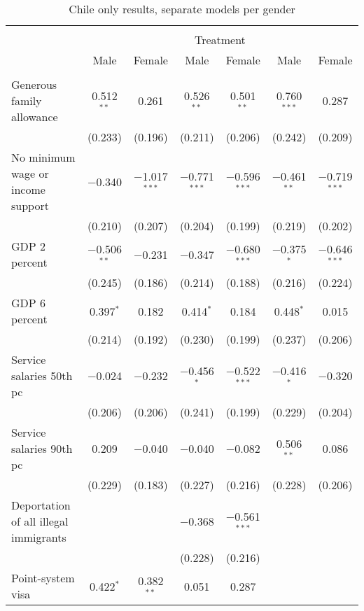 
\begin{sidewaystable}[!htbp] \centering 
  \caption{Chile only results, separate models per gender} 
  \label{tab:chile_gender} 
\begin{tabular}{@{\extracolsep{5pt}}lcccccc} 
\\[-1.8ex]\hline 
\hline \\[-1.8ex] 
 & \multicolumn{6}{c}{Treatment} \\ 
\cline{2-7} 
 & Male & Female & Male & Female & Male & Female \\ 
\hline \\[-1.8ex] 
 Generous family allowance & 0.512$^{**}$ & 0.261 & 0.526$^{**}$ & 0.501$^{**}$ & 0.760$^{***}$ & 0.287 \\ 
  & (0.233) & (0.196) & (0.211) & (0.206) & (0.242) & (0.209) \\ 
  No minimum wage or income support & $-$0.340 & $-$1.017$^{***}$ & $-$0.771$^{***}$ & $-$0.596$^{***}$ & $-$0.461$^{**}$ & $-$0.719$^{***}$ \\ 
  & (0.210) & (0.207) & (0.204) & (0.199) & (0.219) & (0.202) \\ 
  GDP 2 percent & $-$0.506$^{**}$ & $-$0.231 & $-$0.347 & $-$0.680$^{***}$ & $-$0.375$^{*}$ & $-$0.646$^{***}$ \\ 
  & (0.245) & (0.186) & (0.214) & (0.188) & (0.216) & (0.224) \\ 
  GDP 6 percent & 0.397$^{*}$ & 0.182 & 0.414$^{*}$ & 0.184 & 0.448$^{*}$ & 0.015 \\ 
  & (0.214) & (0.192) & (0.230) & (0.199) & (0.237) & (0.206) \\ 
  Service salaries 50th pc & $-$0.024 & $-$0.232 & $-$0.456$^{*}$ & $-$0.522$^{***}$ & $-$0.416$^{*}$ & $-$0.320 \\ 
  & (0.206) & (0.206) & (0.241) & (0.199) & (0.229) & (0.204) \\ 
  Service salaries 90th pc & 0.209 & $-$0.040 & $-$0.040 & $-$0.082 & 0.506$^{**}$ & 0.086 \\ 
  & (0.229) & (0.183) & (0.227) & (0.216) & (0.228) & (0.206) \\ 
  Deportation of all illegal immigrants &  &  & $-$0.368 & $-$0.561$^{***}$ &  &  \\ 
  &  &  & (0.228) & (0.216) &  &  \\ 
  Point-system visa & 0.422$^{*}$ & 0.382$^{**}$ & 0.051 & 0.287 &  &  \\ 

\end{tabular}
\end{sidewaystable}
